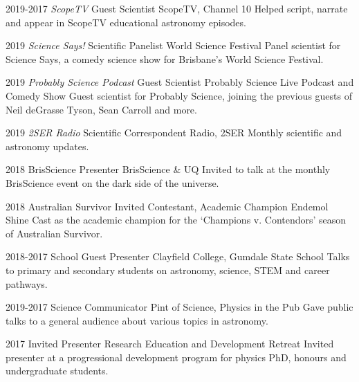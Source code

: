 \documentclass[]{friggeri-cv} %
\begin{document}
\begin{entrylist}
\entry
	{2019-2017}
	{\textit{ScopeTV} Guest Scientist}
	{ScopeTV, Channel 10}
	{Helped script, narrate and appear in ScopeTV educational astronomy episodes.}
\end{entrylist}
\begin{entrylist}
\entry
	{2019}
	{\textit{Science Says!} Scientific Panelist}
	{World Science Festival}
	{Panel scientist for Science Says, a comedy science show for Brisbane's World Science Festival.}
\end{entrylist}
\begin{entrylist}
\entry
	{2019}
	{\textit{Probably Science Podcast }Guest Scientist}
	{Probably Science Live Podcast and Comedy Show}
	{Guest scientist for Probably Science, joining the previous guests of Neil deGrasse Tyson, Sean Carroll and more.}
\end{entrylist}
\begin{entrylist}
\entry
	{2019}
	{\textit{2SER Radio} Scientific Correspondent}
	{Radio, 2SER}
	{Monthly scientific and astronomy updates.}
\end{entrylist}
\begin{entrylist}
\entry
    {2018}
    {BrisScience Presenter}
    {BrisScience \& UQ}
    {Invited to talk at the monthly BrisScience event on the dark side of the universe.}
\end{entrylist}
\begin{entrylist}
\entry
    {2018}
    {Australian Survivor Invited Contestant, Academic Champion}
    {Endemol Shine}
    {Cast as the academic champion for the `Champions v. Contendors' season of Australian Survivor.}
\end{entrylist}
\begin{entrylist}
\entry
    {2018-2017}
    {School Guest Presenter}
    {Clayfield College, Gumdale State School}
    {Talks to primary and secondary students on astronomy, science, STEM and career pathways.}
\end{entrylist}
\begin{entrylist}
\entry
   {2019-2017}
   {Science Communicator}
   {Pint of Science, Physics in the Pub}
   {Gave public talks to a general audience about various topics in astronomy.}
\end{entrylist}
\begin{entrylist}
\entry
    {2017}
    {Invited Presenter}
    {Research Education and Development Retreat}
    {Invited presenter at a progressional development program for physics PhD, honours and undergraduate students.}
\end{entrylist}
\end{document}
